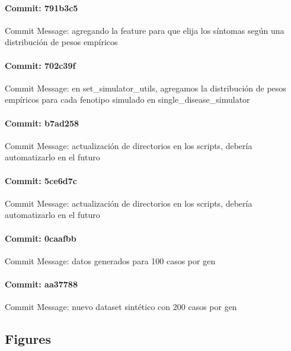 \documentclass{article}
\begin{document}
\paragraph{Commit: 791b3c5}
Commit Message: agregando la feature para que elija los síntomas según una distribución de pesos empíricos

\paragraph{Commit: 702c39f}
Commit Message: en set_simulator_utils, agregamos la distribución de pesos empíricos para cada fenotipo simulado en single_disease_simulator

\paragraph{Commit: b7ad258}
Commit Message: actualización de directorios en los scripts, debería automatizarlo en el futuro

\paragraph{Commit: 5ce6d7c}
Commit Message: actualización de directorios en los scripts, debería automatizarlo en el futuro

\paragraph{Commit: 0caafbb}
Commit Message: datos generados para 100 casos por gen

\paragraph{Commit: aa37788}
Commit Message: nuevo dataset sintético con 200 casos por gen

\subsection{Figures}
\end{document}
